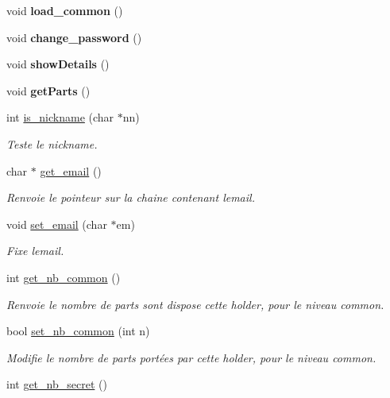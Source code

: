 \begin{DoxyCompactItemize}
void {\bfseries load\+\_\+common} ()
\item 
\mbox{\label{classt__holder_a150cbbb4b6adbf78a40fea1dc40047ea}} 
void {\bfseries change\+\_\+password} ()
\item 
\mbox{\label{classt__holder_a580a59e39b8eb29a92113c1526ea4c36}} 
void {\bfseries show\+Details} ()
\item 
\mbox{\label{classt__holder_a4b1f8ddf75f2655b02997c238c464a31}} 
void {\bfseries get\+Parts} ()
\item 
int \hyperlink{classt__holder_aa7461956a8d02ec385f2c336e1625c0e}{is\+\_\+nickname} (char $\ast$nn)
\begin{DoxyCompactList}\small\item\em Teste le nickname. \end{DoxyCompactList}\item 
char $\ast$ \hyperlink{classt__holder_a2cb08e23684d848bf498050de31874c2}{get\+\_\+email} ()
\begin{DoxyCompactList}\small\item\em Renvoie le pointeur sur la chaine contenant l\textquotesingle{}email. \end{DoxyCompactList}\item 
void \hyperlink{classt__holder_a15589251a3a9a508b0ec04bb565d24c9}{set\+\_\+email} (char $\ast$em)
\begin{DoxyCompactList}\small\item\em Fixe l\textquotesingle{}email. \end{DoxyCompactList}\item 
int \hyperlink{classt__holder_a00ab33ab1bbe0d29f2c0ade8f767d993}{get\+\_\+nb\+\_\+common} ()
\begin{DoxyCompactList}\small\item\em Renvoie le nombre de parts sont dispose cette holder, pour le niveau common. \end{DoxyCompactList}\item 
bool \hyperlink{classt__holder_a0161af13d174c68725a401f12c1c2232}{set\+\_\+nb\+\_\+common} (int n)
\begin{DoxyCompactList}\small\item\em Modifie le nombre de parts portées par cette holder, pour le niveau common. \end{DoxyCompactList}\item 
int \hyperlink{classt__holder_a01e3dcac731099c4e41a5ea375c5bbc1}{get\+\_\+nb\+\_\+secret} ()

\end{DoxyCompactItemize}
